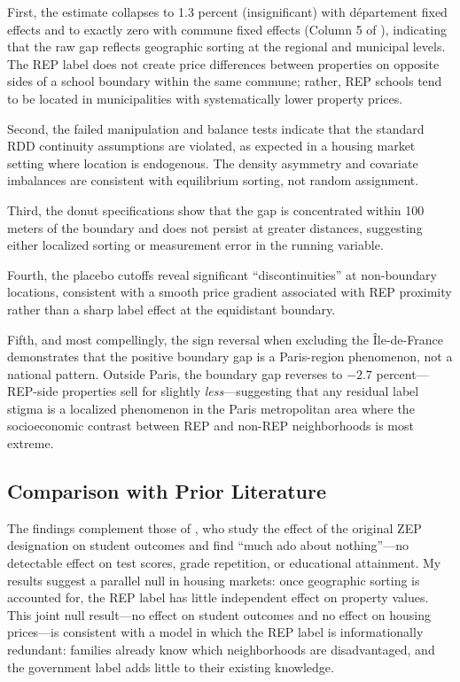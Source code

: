 \documentclass[12pt]{article}
\begin{document}
First, the estimate collapses to 1.3 percent (insignificant) with d\'{e}partement fixed effects and to exactly zero with commune fixed effects (Column 5 of ), indicating that the raw gap reflects geographic sorting at the regional and municipal levels. The REP label does not create price differences between properties on opposite sides of a school boundary within the same commune; rather, REP schools tend to be located in municipalities with systematically lower property prices.

Second, the failed manipulation and balance tests indicate that the standard RDD continuity assumptions are violated, as expected in a housing market setting where location is endogenous. The density asymmetry and covariate imbalances are consistent with equilibrium sorting, not random assignment.

Third, the donut specifications show that the gap is concentrated within 100 meters of the boundary and does not persist at greater distances, suggesting either localized sorting or measurement error in the running variable.

Fourth, the placebo cutoffs reveal significant ``discontinuities'' at non-boundary locations, consistent with a smooth price gradient associated with REP proximity rather than a sharp label effect at the equidistant boundary.

Fifth, and most compellingly, the sign reversal when excluding the \^{I}le-de-France demonstrates that the positive boundary gap is a Paris-region phenomenon, not a national pattern. Outside Paris, the boundary gap reverses to $-2.7$ percent---REP-side properties sell for slightly \textit{less}---suggesting that any residual label stigma is a localized phenomenon in the Paris metropolitan area where the socioeconomic contrast between REP and non-REP neighborhoods is most extreme.

\subsection{Comparison with Prior Literature}

The findings complement those of \citet{beffy2009}, who study the effect of the original ZEP designation on student outcomes and find ``much ado about nothing''---no detectable effect on test scores, grade repetition, or educational attainment. My results suggest a parallel null in housing markets: once geographic sorting is accounted for, the REP label has little independent effect on property values. This joint null result---no effect on student outcomes and no effect on housing prices---is consistent with a model in which the REP label is informationally redundant: families already know which neighborhoods are disadvantaged, and the government label adds little to their existing knowledge.
\end{document}
